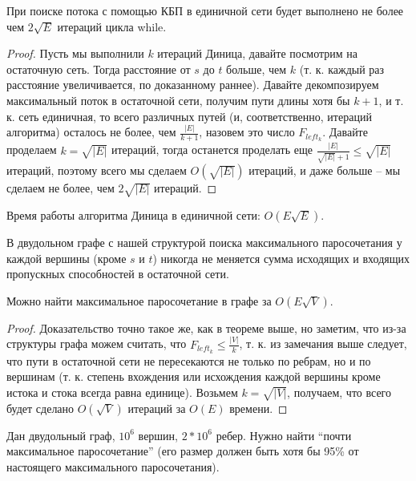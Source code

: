 \begin{theorem}
    При поиске потока с помощью КБП в единичной сети будет выполнено не более чем $2 \sqrt{E}$ итераций цикла while.
\end{theorem}

\begin{proof}
    Пусть мы выполнили $k$ итераций Диница, давайте посмотрим на остаточную сеть. Тогда расстояние от $s$ до $t$ больше, чем $k$ (т. к. каждый раз расстояние увеличивается, по доказанному раннее). Давайте декомпозируем максимальный поток в остаточной сети, получим пути длины хотя бы $k + 1$, и т. к. сеть единичная, то всего различных путей (и, соответственно, итераций алгоритма) осталось не более, чем $\frac{|E|}{k + 1}$, назовем это число $F_{left_k}$. Давайте проделаем $k = \sqrt{|E|}$ итераций, тогда останется проделать еще $\frac{|E|}{\sqrt{|E|} + 1} \leq \sqrt{|E|}$ итераций, поэтому всего мы сделаем $O(\sqrt{|E|})$ итераций, и даже больше -- мы сделаем не более, чем $2\sqrt{|E|}$ итераций.
\end{proof}

\begin{corollary}
    Время работы алгоритма Диница в единичной сети: $O(E\sqrt{E})$.
\end{corollary}

\begin{note}
    В двудольном графе с нашей структурой поиска максимального паросочетания у каждой вершины (кроме $s$ и $t$) никогда не меняется сумма исходящих и входящих пропускных способностей в остаточной сети.
\end{note}

\begin{proposition}
    Можно найти максимальное паросочетание в графе за $O(E\sqrt{V})$.
\end{proposition}

\begin{proof}
    Доказательство точно такое же, как в теореме выше, но заметим, что из-за структуры графа можем считать, что $F_{left_k} \leq \frac{|V|}{k}$, т. к. из замечания выше следует, что пути в остаточной сети не пересекаются не только по ребрам, но и по вершинам (т. к. степень вхождения или исхождения каждой вершины кроме истока и стока всегда равна единице). Возьмем $k = \sqrt{|V|}$, получаем, что всего будет сделано $O(\sqrt{V})$ итераций за $O(E)$ времени.
\end{proof}

\begin{problem}
    Дан двудольный граф, $10^6$ вершин, $2 * 10^6$ ребер. Нужно найти ``почти максимальное паросочетание'' (его размер должен быть хотя бы 95\% от настоящего максимального паросочетания).
\end{problem}

